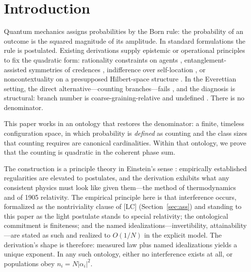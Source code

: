 \documentclass[11pt]{article}
\theoremstyle{definition}
\theoremstyle{remark}
\begin{document}
\section{Introduction}\label{sec:intro}
Quantum mechanics assigns probabilities by the Born rule: the probability of an outcome is the squared magnitude of its amplitude. In standard formulations the rule is postulated. Existing derivations supply epistemic or operational principles to fix the quadratic form: rationality constraints on agents \cite{Deutsch1999,Wallace2007,Wallace2012}, entanglement-assisted symmetries of credences \cite{Zurek2005}, indifference over self-location \cite{SebensCarroll2018}, or noncontextuality on a presupposed Hilbert-space structure \cite{Gleason1957,Busch2003}. In the Everettian setting, the direct alternative---counting branches---fails \cite{Graham1973}, and the diagnosis is structural: branch number is coarse-graining-relative and undefined \cite{Wallace2012}. There is no denominator.

This paper works in an ontology that restores the denominator: a finite, timeless configuration space, in which probability is \emph{defined} as counting and the class sizes that counting requires are canonical cardinalities. Within that ontology, we prove that the counting is quadratic in the coherent phase sum.

The construction is a principle theory in Einstein's sense \cite{Einstein1919}: empirically established regularities are elevated to postulates, and the derivation exhibits what any consistent physics must look like given them---the method of thermodynamics and of 1905 relativity. The empirical principle here is that interference occurs, formalized as the nontriviality clause of [LC] (Section~\ref{sec:ass}) and standing to this paper as the light postulate stands to special relativity; the ontological commitment is finiteness; and the named idealizations---invertibility, attainability---are stated as such and realized to $O(1/N)$ in the explicit model. The derivation's shape is therefore: measured law plus named idealizations yields a unique exponent. In any such ontology, either no interference exists at all, or populations obey $n_i = N|\alpha_i|^2$.
\end{document}
